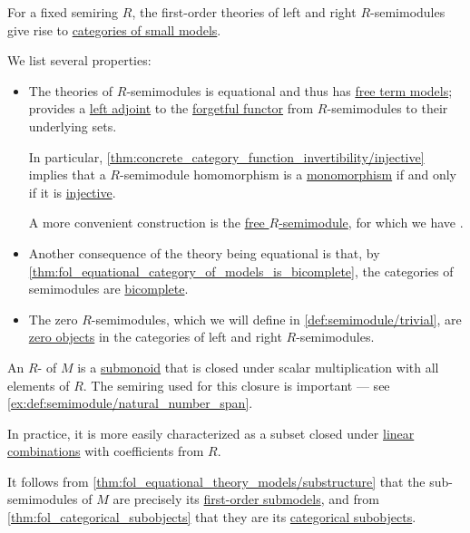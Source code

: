 \begin{definition}
\begin{thmenum}[resume=def:semimodule]
    \mimprovised For a fixed semiring \( R \), the first-order theories of left and right \( R \)-semimodules give rise to \hyperref[def:fol_theory_model_functor/obj]{categories of small models}.

    We list several properties:
    \begin{itemize}
      \item The theories of \( R \)-semimodules is equational and thus has \hyperref[def:fol_free_term_model]{free term models};  provides a \hyperref[def:adjoint_functor]{left adjoint} to the \hyperref[def:fol_theory_forgetful_functor/set]{forgetful functor} from \( R \)-semimodules to their underlying sets.

      In particular, \cref{thm:concrete_category_function_invertibility/injective} implies that a \( R \)-semimodule homomorphism is a \hyperref[def:morphism_cancellation/left]{monomorphism} if and only if it is \hyperref[def:function_invertibility/injective]{injective}.

      A more convenient construction is the \hyperref[def:free_semimodule]{free \( R \)-semimodule}, for which we have .

      \item Another consequence of the theory being equational is that, by \cref{thm:fol_equational_category_of_models_is_bicomplete}, the categories of semimodules are \hyperref[def:bicomplete_category]{bicomplete}.

      \item The zero \( R \)-semimodules, which we will define in \cref{def:semimodule/trivial}, are \hyperref[def:universal_objects/zero]{zero objects} in the categories of left and right \( R \)-semimodules.
    \end{itemize}

     An \( R \)- of \( M \) is a \hyperref[def:monoid/subobject]{submonoid} that is closed under scalar multiplication with all elements of \( R \). The semiring used for this closure is important --- see \cref{ex:def:semimodule/natural_number_span}.

    In practice, it is more easily characterized as a subset closed under \hyperref[def:linear_combination]{linear combinations} with coefficients from \( R \).

    It follows from \cref{thm:fol_equational_theory_models/substructure} that the sub-semimodules of \( M \) are precisely its \hyperref[def:fol_substructure/submodel]{first-order submodels}, and from \cref{thm:fol_categorical_subobjects} that they are its \hyperref[def:categorical_subobject]{categorical subobjects}.


\end{thmenum}
\end{definition}
